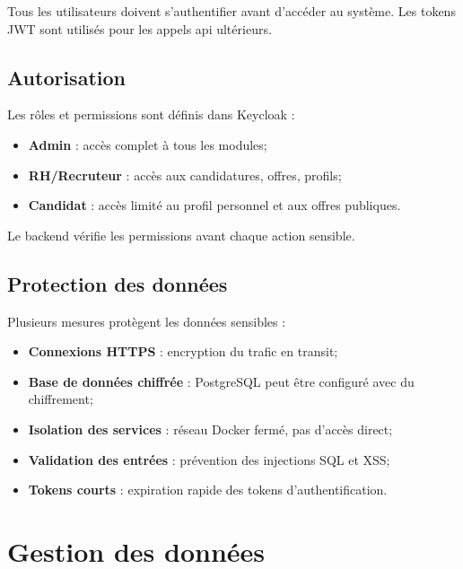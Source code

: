 Tous les utilisateurs doivent s'authentifier avant d'accéder au système. Les tokens JWT sont utilisés pour les appels \acrfull{api} ultérieurs.


\subsection{Autorisation}
\label{subsec:autorisation}

Les rôles et permissions sont définis dans Keycloak :

\begin{itemize}
    \item \textbf{Admin} : accès complet à tous les modules;
    
    \item \textbf{RH/Recruteur} : accès aux candidatures, offres, profils;
    
    \item \textbf{Candidat} : accès limité au profil personnel et aux offres publiques.
\end{itemize}

Le backend vérifie les permissions avant chaque action sensible.


\subsection{Protection des données}
\label{subsec:protection-donnees}

Plusieurs mesures protègent les données sensibles :

\begin{itemize}
    \item \textbf{Connexions HTTPS} : encryption du trafic en transit;
    
    \item \textbf{Base de données chiffrée} : PostgreSQL peut être configuré avec du chiffrement;
    
    \item \textbf{Isolation des services} : réseau Docker fermé, pas d'accès direct;
    
    \item \textbf{Validation des entrées} : prévention des injections SQL et XSS;
    
    \item \textbf{Tokens courts} : expiration rapide des tokens d'authentification.
\end{itemize}


\section{Gestion des données}
\label{sec:gestion-donnees}

